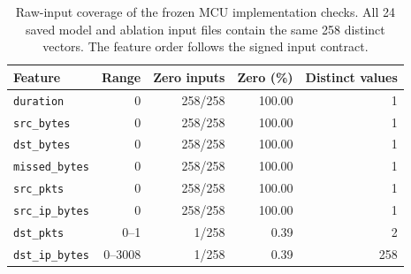 \begin{table}[H]
\caption{Raw-input coverage of the frozen MCU implementation checks. All 24 saved model and ablation input files contain the same 258 distinct vectors. The feature order follows the signed input contract.}
\label{tab:hardware-vector-coverage}
\centering\small
\begin{tabular}{lrrrr}
\toprule
Feature & Range & Zero inputs & Zero (\%) & Distinct values \\
\midrule
\texttt{duration} & 0 & 258/258 & 100.00 & 1 \\
\texttt{src\_bytes} & 0 & 258/258 & 100.00 & 1 \\
\texttt{dst\_bytes} & 0 & 258/258 & 100.00 & 1 \\
\texttt{missed\_bytes} & 0 & 258/258 & 100.00 & 1 \\
\texttt{src\_pkts} & 0 & 258/258 & 100.00 & 1 \\
\texttt{src\_ip\_bytes} & 0 & 258/258 & 100.00 & 1 \\
\texttt{dst\_pkts} & 0--1 & 1/258 & 0.39 & 2 \\
\texttt{dst\_ip\_bytes} & 0--3008 & 1/258 & 0.39 & 258 \\
\bottomrule
\end{tabular}
\end{table}
